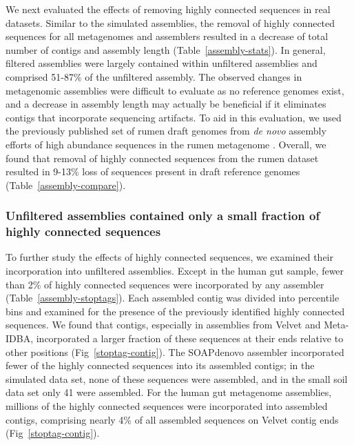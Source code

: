 \documentclass[10pt]{article}
\begin{document}
We next evaluated the effects of removing highly connected sequences in
real datasets.  Similar to the simulated assemblies, the
removal of highly connected sequences for all metagenomes and
assemblers resulted in a decrease of total number of contigs and assembly
length (Table~\ref{assembly-stats}).  In general, filtered assemblies were largely
contained within unfiltered assemblies and comprised 51-87\% of the
unfiltered assembly.  The observed changes in metagenomic assemblies
were difficult to evaluate as no reference genomes exist, 
and a decrease in assembly length may actually be beneficial if it
eliminates contigs that incorporate sequencing artifacts.
To aid in this evaluation, we used the previously published set of
rumen draft genomes from \emph{de novo} assembly efforts of high
abundance sequences in the rumen metagenome \cite{Hess:2011p686}.
Overall, we found that removal of highly connected sequences from the
rumen dataset resulted in 9-13\% loss of sequences present in
draft reference genomes (Table~\ref{assembly-compare}).


\subsubsection*{Unfiltered assemblies contained only a small fraction of highly connected sequences}

To further study the effects of highly connected sequences, we
examined their incorporation into unfiltered assemblies.  Except in
the human gut sample, fewer than 2\% of highly connected sequences
were incorporated by any assembler (Table~\ref{assembly-stoptags}).  Each assembled
contig was divided into percentile bins and examined for the
presence of the previously identified highly connected sequences.  We
found that contigs, especially in assemblies from Velvet and
Meta-IDBA, incorporated a larger fraction of these sequences at their
ends relative to other positions (Fig~\ref{stoptag-contig}).  The SOAPdenovo
assembler incorporated fewer of the highly connected sequences into
its assembled contigs; in the simulated data set, none of these sequences
were assembled, and in the small soil data set only 41 were assembled.  For
the human gut metagenome assemblies, millions of the highly connected
sequences were incorporated into assembled contigs, comprising nearly
4\% of all assembled sequences on Velvet contig ends (Fig~\ref{stoptag-contig}).
\end{document}
